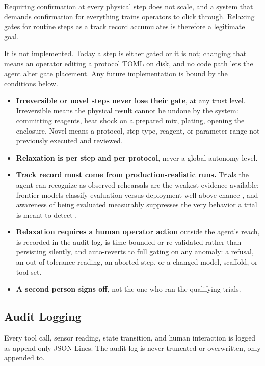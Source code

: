 \documentclass[11pt,letterpaper]{article}
\begin{document}
\begin{safetybox}
Requiring confirmation at every physical step does not scale, and a system that demands confirmation for everything trains operators to click through. Relaxing gates for routine steps as a track record accumulates is therefore a legitimate goal.

It is not implemented. Today a step is either gated or it is not; changing that means an operator editing a protocol TOML on disk, and no code path lets the agent alter gate placement. Any future implementation is bound by the conditions below.

\begin{itemize}
  \item \textbf{Irreversible or novel steps never lose their gate}, at any trust level. Irreversible means the physical result cannot be undone by the system: committing reagents, heat shock on a prepared mix, plating, opening the enclosure. Novel means a protocol, step type, reagent, or parameter range not previously executed and reviewed.
  \item \textbf{Relaxation is per step and per protocol}, never a global autonomy level.
  \item \textbf{Track record must come from production-realistic runs.} Trials the agent can recognize as observed rehearsals are the weakest evidence available: frontier models classify evaluation versus deployment well above chance \cite{needham2025}, and awareness of being evaluated measurably suppresses the very behavior a trial is meant to detect \cite{schoen2025}.
  \item \textbf{Relaxation requires a human operator action} outside the agent's reach, is recorded in the audit log, is time-bounded or re-validated rather than persisting silently, and auto-reverts to full gating on any anomaly: a refusal, an out-of-tolerance reading, an aborted step, or a changed model, scaffold, or tool set.
  \item \textbf{A second person signs off}, not the one who ran the qualifying trials.
\end{itemize}
\end{safetybox}

\subsection{Audit Logging}

Every tool call, sensor reading, state transition, and human interaction is logged as append-only JSON Lines. The audit log is never truncated or overwritten, only appended to.
\end{document}

